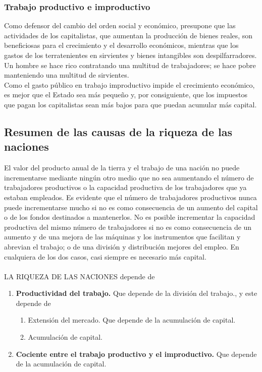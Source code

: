 \documentclass[10pt]{book}
\begin{document}
\subsubsection*{Trabajo productivo e improductivo}
Como defensor del cambio del orden social y económico, presupone que las actividades de los capitalistas, que aumentan la producción de bienes reales, son beneficiosas para el crecimiento y el desarrollo económicos, mientras que los gastos de los terratenientes en sirvientes y bienes intangibles son despilfarradores. Un hombre se hace rico contratando una multitud de trabajadores; se hace pobre manteniendo una multitud de sirvientes.\\
Como el gasto público en trabajo improductivo impide el crecimiento económico, es mejor que el Estado sea más pequeño y, por consiguiente, que los impuestos que pagan los capitalistas sean más bajos para que puedan acumular más capital.

\subsection*{Resumen de las causas de la riqueza de las naciones}
El valor del producto anual de la tierra y el trabajo de una nación no puede incrementarse mediante ningún otro medio que no sea aumentando el número de trabajadores productivos o la capacidad productiva de los trabajadores que ya estaban empleados. Es evidente que el número de trabajadores productivos nunca puede incrementarse mucho si no es como consecuencia de un aumento del capital o de los fondos destinados a mantenerlos. No es posible incrementar la capacidad productiva del mismo número de trabajadores si no es como consecuencia de un aumento y de una mejora de las máquinas y los instrumentos que facilitan y abrevian el trabajo; o de una división y distribución mejores del empleo. En cualquiera de los dos casos, casi siempre es necesario más capital.\\\\

LA RIQUEZA DE LAS NACIONES depende de

\begin{enumerate}[\bfseries 1.]
    \item \textbf{Productividad del trabajo.} Que depende de la división del trabajo., y este depende de 
	\begin{enumerate}[\bfseries a.]
	    \item Extensión del mercado. Que depende de la acumulación de capital.
	    \item Acumulación de capital.
	\end{enumerate}
    \item \textbf{Cociente entre el trabajo productivo y el improductivo.} Que depende de la acumulación de capital.
\end{enumerate}
\end{document}
